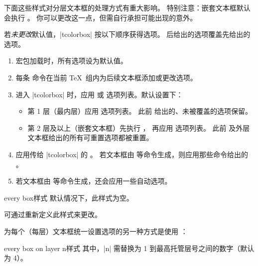 下面这些样式对分层文本框的处理方式有重大影响。
特别注意：嵌套文本框默认会执行 。
你可以更改这一点，但需自行承担可能出现的意外。

若\emph{未更改}默认值，|tcolorbox| 按以下顺序获得选项。
后给出的选项覆盖先给出的选项。
\begin{enumerate}
\item 宏包加载时，所有选项设为默认值。
\item 每条  命令在当前 \TeX\ 组内为后续文本框添加或更改选项。
\item 进入 |tcolorbox| 时，应用  或
   选项列表。默认设置下：
  \begin{itemize}
  \item 第 1 层（最内层）应用  选项列表。
    此前  给出的、未被覆盖的选项保留。
  \item 第 2 层及以上（嵌套文本框）先执行 ，
    再应用  选项列表。
    此前  及外层文本框给出的所有可重置选项都被重置。
  \end{itemize}
\item 应用传给 |tcolorbox| 的 。
  若文本框由  等命令生成，则应用那些命令给出的 。
\item 若文本框由  等命令生成，还会应用一些自动选项。
\end{enumerate}


\begin{docTcbKey}{every box}{}{样式}
默认情况下，此样式为空。
\begin{dispListing}
\end{dispListing}
可通过重新定义此样式来更改。
\begin{dispListing}
\end{dispListing}

\medskip
\begin{marker}
为每个（每层）文本框统一设置选项的另一种方式是使用
：
\begin{dispListing}
\end{dispListing}
\end{marker}
\end{docTcbKey}

\clearpage
\begin{docTcbKey}{every box on layer n}{}{样式}
其中，|n| 需替换为 1 到最高托管层号之间的数字（默认为 4）。
\begin{dispListing}
\end{dispListing}
\end{docTcbKey}


